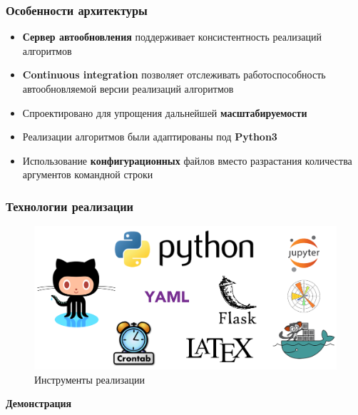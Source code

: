 \documentclass{beamer}
\begin{document}
\begin{frame}
    \frametitle{Особенности архитектуры}
    \begin{itemize}
         \item \textbf{Сервер автообновления} поддерживает консистентность
              реализаций алгоритмов
         \item \textbf{Continuous integration} позволяет отслеживать
              работоспособность автообновляемой версии реализаций алгоритмов
        \item Спроектировано для упрощения дальнейшей \textbf{масштабируемости}
        \item Реализации алгоритмов были адаптированы под
              \textbf{Python3}
        \item Использование \textbf{конфигурационных} файлов вместо разрастания
              количества аргументов командной строки
    \end{itemize}
\end{frame}

\begin{frame}
    \frametitle{Технологии реализации}
    \begin{figure}
        \includegraphics[width=\columnwidth]{tech.png}
        \caption{\small Инструменты реализации}
    \end{figure}
\end{frame}

\begin{frame}
    \centering
    \LARGE \bfseries \color{white}
    Демонстрация
\end{frame}
\end{document}
